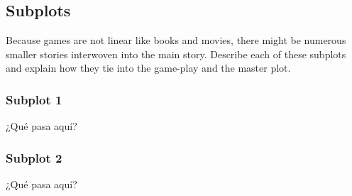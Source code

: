 \subsection{Subplots}%
Because games are not linear like books and movies, there might be numerous
smaller stories interwoven into the main story. Describe each of these subplots
and explain how they tie into the game-play and the master plot.

\subsubsection{Subplot 1}%
¿Qué pasa aquí?
\subsubsection{Subplot 2}%
¿Qué pasa aquí?